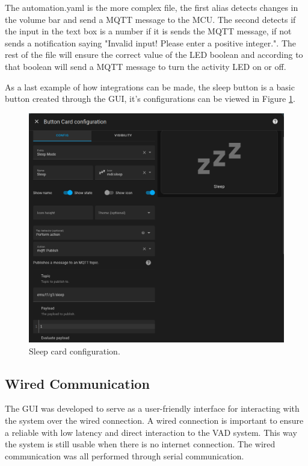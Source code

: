 The automation.yaml is the more complex file, the first alias detects changes in the volume bar and send a MQTT message to the MCU. The second detects if the input in the text box is a number if it is sends the MQTT message, if not sends a notification saying "Invalid input! Please enter a positive integer.". The rest of the file will ensure the correct value of the LED boolean and according to that boolean will send a MQTT message to turn the activity LED on or off.

As a last example of how integrations can be made, the sleep button is a basic button created through the GUI, it's configurations can be viewed in Figure \ref{fig:SleepCard}.

\begin{figure}[H]
    \centering
    \includegraphics*[scale = 0.3]{Images/SleepCard.png}
    \caption{Sleep card configuration.}
    \label{fig:SleepCard}
\end{figure}

\subsection{Wired Communication}

The GUI was developed to serve as a user-friendly interface for interacting with the system over the wired connection. A wired connection is important to ensure a reliable with low latency and direct interaction to the VAD system. This way the system is still usable when there is no internet connection. The wired communication was all performed through serial communication.

